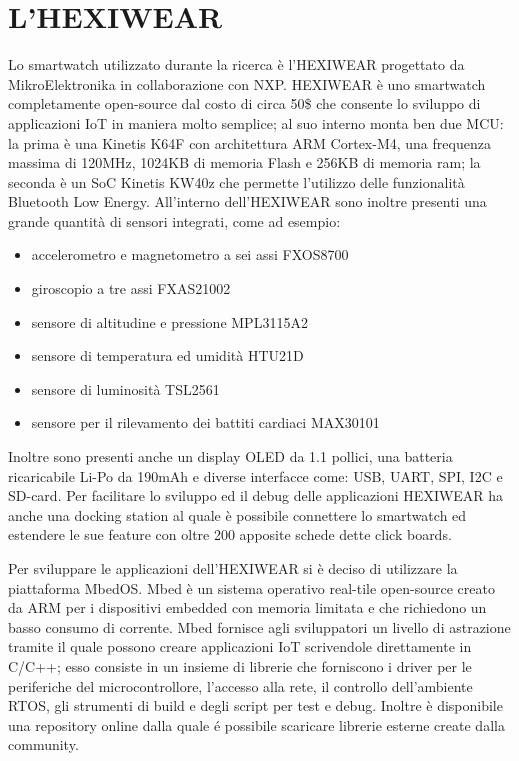 \section{L'HEXIWEAR}

Lo smartwatch utilizzato durante la ricerca è l’HEXIWEAR progettato da MikroElektronika in collaborazione con NXP. HEXIWEAR è uno smartwatch completamente open-source dal costo di circa 50\$ che 
consente lo sviluppo di applicazioni IoT in maniera molto semplice; al suo interno monta ben due MCU: la prima è una Kinetis K64F con architettura ARM Cortex-M4, una frequenza massima di 120MHz, 
1024KB di memoria Flash e 256KB di memoria ram; la seconda è un SoC Kinetis KW40z che permette l’utilizzo delle funzionalità Bluetooth Low Energy. 
All'interno dell'HEXIWEAR sono inoltre presenti una grande quantità di sensori integrati, come ad esempio: 

\begin{itemize}
    \item accelerometro e magnetometro a sei assi FXOS8700
    \item giroscopio a tre assi FXAS21002
    \item sensore di altitudine e pressione MPL3115A2
    \item sensore di temperatura ed umidità HTU21D
    \item sensore di luminosità TSL2561
    \item sensore per il rilevamento dei battiti cardiaci MAX30101
\end{itemize}

Inoltre sono presenti anche un display OLED da 1.1 pollici, una batteria ricaricabile Li-Po da 190mAh e diverse interfacce come: USB, UART, SPI, I2C e SD-card.
Per facilitare lo sviluppo ed il debug delle applicazioni HEXIWEAR ha anche una docking station al quale è possibile connettere lo smartwatch ed estendere le sue feature con oltre 200 
apposite schede dette click boards.

Per sviluppare le applicazioni dell'HEXIWEAR si è deciso di utilizzare la piattaforma MbedOS. Mbed è un sistema operativo real-tile open-source creato da ARM per i dispositivi 
embedded con memoria limitata e che richiedono un basso consumo di corrente. 
Mbed fornisce agli sviluppatori un livello di astrazione tramite il quale possono creare applicazioni IoT scrivendole direttamente in C/C++; esso consiste in un insieme di librerie che 
forniscono i driver per le periferiche del microcontrollore, l'accesso alla rete, il controllo dell'ambiente RTOS, gli strumenti di build e degli script per test e debug. 
Inoltre è disponibile una repository online dalla quale é possibile scaricare librerie esterne create dalla community.
